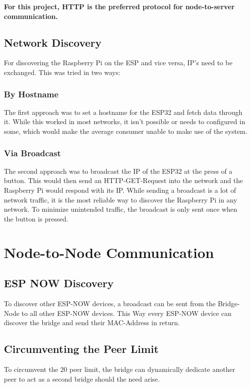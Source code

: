     \vspace{1cm}
    \textbf{For this project, HTTP is the preferred protocol for 
    node-to-server communication.}

    \subsection{Network Discovery}
    For discovering the Raspberry Pi on the ESP and vice versa,
    IP's need to be exchanged. This was tried in two ways:
        \subsubsection{By Hostname}
        The first approach was to set a hostname for the 
        ESP32 and fetch data through it. While this worked
        in most networks, it isn't possible or needs to 
        configured in some, which would make the average 
        consumer unable to make use of the system.

        \subsubsection{Via Broadcast}
        The second approach was to broadcast the IP of the ESP32
        at the press of a button. This would then send an 
        HTTP-GET-Request into the network and the Raspberry Pi
        would respond with its IP. While sending a broadcast is
        a lot of network traffic, it is the most reliable way
        to discover the Raspberry Pi in any network. To minimize
        unintended traffic, the broadcast is only sent once when the
        button is pressed.
        

\section{Node-to-Node Communication}
    \subsection{ESP NOW Discovery}
    To discover other ESP-NOW devices, a broadcast can be sent
    from the Bridge-Node to all other ESP-NOW devices. This
    Way every ESP-NOW device can discover the bridge and send
    their MAC-Address in return.

    \subsection{Circumventing the Peer Limit}
    To circumvent the 20 peer limit, the bridge can dynamically
    dedicate another peer to act as a second bridge should the
    need arise. 




    